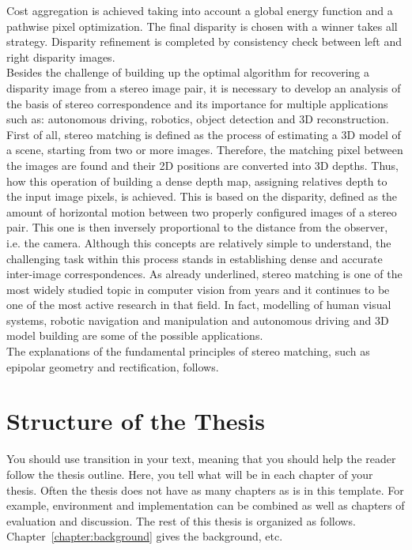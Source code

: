 Cost aggregation is achieved taking into account a global energy function and a pathwise pixel optimization. 
The final disparity is chosen with a winner takes all strategy. 
Disparity refinement is completed by consistency check between left and right disparity images. \\
Besides the challenge of building up the optimal algorithm for recovering a disparity image from a stereo image pair, it is necessary to develop an analysis of the basis of stereo correspondence and its importance for multiple applications such as: autonomous driving, robotics, object detection and 3D reconstruction. \\
First of all, stereo matching is defined as the process of estimating a 3D model of a scene, starting from two or more images. 
Therefore, the matching pixel between the images are found and their 2D positions are converted into 3D depths. 
Thus, how this operation of building a dense depth map, assigning relatives depth to the input image pixels, is achieved. 
This is based on the disparity, defined as the amount of horizontal motion between two properly configured images of a stereo pair. 
This one is then inversely proportional to the distance from the observer, i.e. the camera. 
Although this concepts are relatively simple to understand, the challenging task within this process stands in establishing dense and accurate inter-image correspondences\citep{Szeliski2011}.
As already underlined, stereo matching is one of the most widely studied topic in computer vision from years and it continues to be one of the most active research in that field. 
In fact, modelling of human visual systems, robotic navigation and manipulation and autonomous driving \citep{Poggi2019} and 3D model building are some of the possible applications.\\
The explanations of the fundamental principles of stereo matching, such as epipolar geometry and rectification, follows.\\




\section{Structure of the Thesis}
\label{section:structure} 

You should use transition in your text, meaning that you should help
the reader follow the thesis outline. Here, you tell what will be in
each chapter of your thesis. Often the thesis does not have as many
chapters as is in this template. For example, environment and
implementation can be combined as well as chapters of evaluation and
discussion.  The rest of this thesis is organized as
follows. Chapter~\ref{chapter:background} gives the background, etc.


